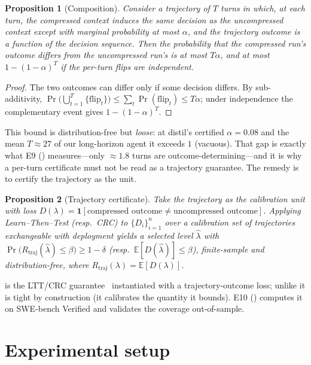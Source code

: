\documentclass[11pt]{article}
\newtheorem{proposition}{Proposition}
\begin{document}
\begin{proposition}[Composition]\label{prop:compose}
Consider a trajectory of $T$ turns in which, at each turn, the compressed context induces the
same decision as the uncompressed context except with marginal probability at most $\alpha$,
and the trajectory outcome is a function of the decision sequence. Then the probability that
the compressed run's outcome differs from the uncompressed run's is at most $T\alpha$, and at
most $1-(1-\alpha)^{T}$ if the per-turn flips are independent.
\end{proposition}
\begin{proof}
The two outcomes can differ only if some decision differs. By sub-additivity,
$\Pr\!\big(\bigcup_{t=1}^{T}\{\text{flip}_t\}\big)\le\sum_{t}\Pr(\text{flip}_t)\le T\alpha$;
under independence the complementary event gives $1-(1-\alpha)^{T}$.
\end{proof}

\noindent This bound is distribution-free but \emph{loose}: at distil's certified
$\alpha=0.08$ and the mean $T\approx27$ of our long-horizon agent it exceeds $1$ (vacuous).
That gap is exactly what E9 () measures---only $\approx1.8$ turns are
outcome-determining---and it is why a per-turn certificate must not be read as a trajectory
guarantee. The remedy is to certify the trajectory as the unit.

\begin{proposition}[Trajectory certificate]\label{prop:trajcert}
Take the trajectory as the calibration unit with loss
$D(\lambda)=\mathbf 1[\text{compressed outcome}\neq\text{uncompressed outcome}]$. Applying
Learn--Then--Test (resp.\ CRC) to $\{D_i\}_{i=1}^{n}$ over a calibration set of trajectories
exchangeable with deployment yields a selected level $\hat\lambda$ with
$\Pr\!\big(R_{\mathrm{traj}}(\hat\lambda)\le\beta\big)\ge 1-\delta$
(resp.\ $\mathbb E[D(\hat\lambda)]\le\beta$), finite-sample and distribution-free, where
$R_{\mathrm{traj}}(\lambda)=\mathbb E[D(\lambda)]$.
\end{proposition}
\noindent {} is the LTT/CRC guarantee~\cite{ltt,crc} instantiated with a
trajectory-outcome loss; unlike  it is tight by construction (it calibrates
the quantity it bounds). E10 () computes it on SWE-bench Verified and validates
the coverage out-of-sample.

\section{Experimental setup}
\label{sec:setup}
\end{document}
